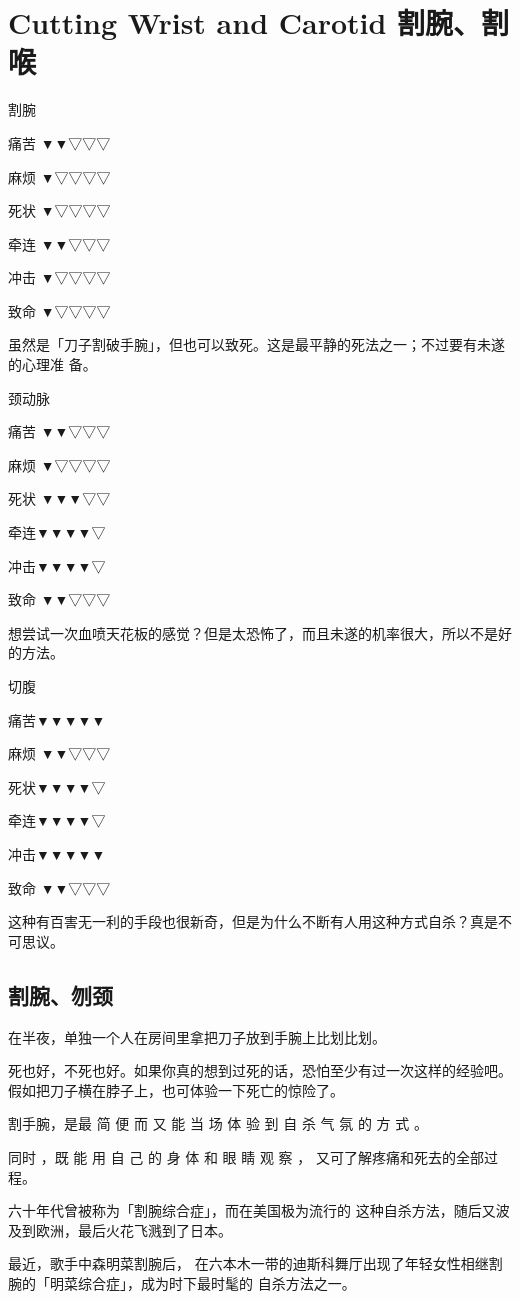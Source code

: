 \documentclass[UTF8]{ctexart}
\begin{document}
\section{Cutting Wrist and Carotid 割腕、割喉}

割腕

痛苦 ▼▼▽▽▽

麻烦 ▼▽▽▽▽

死状 ▼▽▽▽▽

牵连 ▼▼▽▽▽

冲击 ▼▽▽▽▽

致命 ▼▽▽▽▽

虽然是「刀子割破手腕」，但也可以致死。这是最平静的死法之一；不过要有未遂的心理准
备。

颈动脉

痛苦 ▼▼▽▽▽

麻烦 ▼▽▽▽▽

死状 ▼▼▼▽▽

牵连▼▼▼▼▽

冲击▼▼▼▼▽

致命 ▼▼▽▽▽

想尝试一次血喷天花板的感觉？但是太恐怖了，而且未遂的机率很大，所以不是好的方法。

切腹

痛苦▼▼▼▼▼

麻烦 ▼▼▽▽▽

死状▼▼▼▼▽

牵连▼▼▼▼▽

冲击▼▼▼▼▼

致命 ▼▼▽▽▽

这种有百害无一利的手段也很新奇，但是为什么不断有人用这种方式自杀？真是不可思议。

\subsection*{割腕、刎颈}

在半夜，单独一个人在房间里拿把刀子放到手腕上比划比划。

死也好，不死也好。如果你真的想到过死的话，恐怕至少有过一次这样的经验吧。假如把刀子横在脖子上，也可体验一下死亡的惊险了。

割手腕，是最 简 便 而 又 能 当 场 体 验 到 自 杀 气 氛 的 方 式 。

同时 ，既 能 用 自 己 的 身 体 和 眼 睛 观 察 ， 又可了解疼痛和死去的全部过程。

六十年代曾被称为「割腕综合症」，而在美国极为流行的
这种自杀方法，随后又波及到欧洲，最后火花飞溅到了日本。

最近，歌手中森明菜割腕后， 在六本木一带的迪斯科舞厅出现了年轻女性相继割腕的「明菜综合症」，成为时下最时髦的 自杀方法之一。
\end{document}

